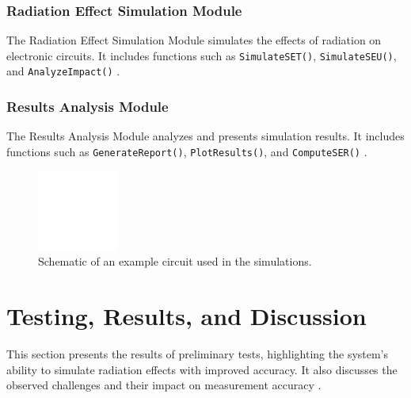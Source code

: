 \documentclass[conference]{IEEEtran}
\begin{document}
\subsubsection{Radiation Effect Simulation Module}
The Radiation Effect Simulation Module simulates the effects of radiation on electronic circuits. It includes functions such as \texttt{SimulateSET()}, \texttt{SimulateSEU()}, and \texttt{AnalyzeImpact()} \cite{Pepper1990}.

\subsubsection{Results Analysis Module}
The Results Analysis Module analyzes and presents simulation results. It includes functions such as \texttt{GenerateReport()}, \texttt{PlotResults()}, and \texttt{ComputeSER()} \cite{Pepper1990}.

\begin{figure}[htbp]
\centering
\includegraphics[width=0.8\linewidth]{example_circuit_placeholder.png}
\caption{Schematic of an example circuit used in the simulations.}
\label{fig:example_circuit}
\end{figure}

\section{Testing, Results, and Discussion}
This section presents the results of preliminary tests, highlighting the system's ability to simulate radiation effects with improved accuracy. It also discusses the observed challenges and their impact on measurement accuracy \cite{Pepper1990}.
\end{document}
